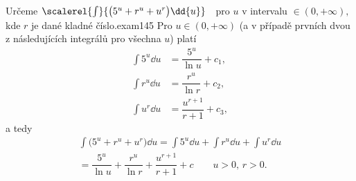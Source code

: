 \begin{mathexam}{Určeme \(\protect\scalerel{\int}{\bigl(5^u + r^u + u^r\bigr)\dd{u}}\quad\)pro \(u\)
  v intervalu \(\in(0, +\infty),\) kde \(r\) je dané kladné číslo.}{exam145}
    Pro \(u\in(0, +\infty)\) (a v případě prvních dvou z následujících integrálů pro všechna \(u\))
    platí
    \begin{align*}
      \int 5^u\dd{u}  &= \dfrac{5^u}{\ln u}   + c_1,  \\
      \int r^u\dd{u}  &= \dfrac{r^u}{\ln r}   + c_2,  \\
      \int u^r\dd{u}  &= \dfrac{u^{r+1}}{r+1} + c_3,
    \end{align*}  
    a tedy
    \begin{multline*}
      \int\bigl(5^u + r^u + u^r\bigr)\dd{u} = \int 5^u\dd{u}+\int r^u\dd{u}+\int u^r\dd{u}        \\
          =\dfrac{5^u}{\ln u} + \dfrac{r^u}{\ln r} + \dfrac{u^{r+1}}{r+1} + c\qquad u>0, \, r>0. 
    \end{multline*}
\end{mathexam}